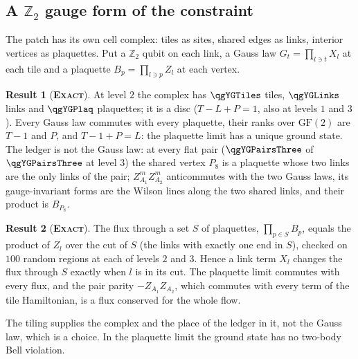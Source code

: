 \documentclass[11pt]{article}
\newcommand{\exact}{\textbf{\textsc{Exact}}}
\theoremstyle{definition}
\newtheorem{result}{Result}
\begin{document}
\subsection{A $\mathbb{Z}_2$ gauge form of the constraint}\label{sec:ham-gauge}
The patch has its own cell complex: tiles as sites, shared edges as links, interior vertices as plaquettes. Put a $\mathbb{Z}_2$ qubit on each link, a Gauss law $G_t=\prod_{l\ni t}X_l$ at each tile and a plaquette $B_p=\prod_{l\ni p}Z_l$ at each vertex.
\begin{result}[\exact]\label{res:ham-gauge}
At level $2$ the complex has $\qgYGTiles$ tiles, $\qgYGLinks$ links and $\qgYGPlaq$ plaquettes; it is a disc ($T-L+P=1$, also at levels $1$ and $3$). Every Gauss law commutes with every plaquette, their ranks over $\mathrm{GF}(2)$ are $T-1$ and $P$, and $T-1+P=L$: the plaquette limit has a unique ground state. The ledger is not the Gauss law: at every flat pair ($\qgYGPairsThree$ of $\qgYGPairsThree$ at level $3$) the shared vertex $P_8$ is a plaquette whose two links are the only links of the pair; $Z^m_{A_1}Z^m_{A_2}$ anticommutes with the two Gauss laws, its gauge-invariant forms are the Wilson lines along the two shared links, and their product is $B_{P_8}$.
\end{result}
\begin{result}[\exact]\label{res:flux-transfer}
The flux through a set $S$ of plaquettes, $\prod_{p\in S}B_p$, equals the product of $Z_l$ over the cut of $S$ (the links with exactly one end in $S$), checked on $100$ random regions at each of levels $2$ and $3$. Hence a link term $X_l$ changes the flux through $S$ exactly when $l$ is in its cut. The plaquette limit commutes with every flux, and the pair parity $-Z_{A_1}Z_{A_2}$, which commutes with every term of the tile Hamiltonian, is a flux conserved for the whole flow.
\end{result}
The tiling supplies the complex and the place of the ledger in it, not the Gauss law, which is a choice. In the plaquette limit the ground state has no two-body Bell violation.
\end{document}
